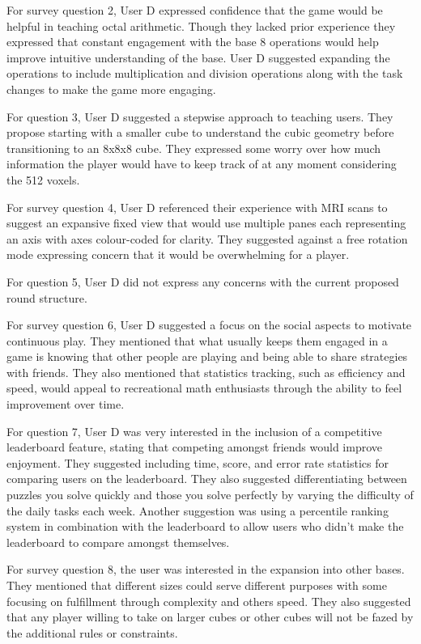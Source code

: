 \documentclass{article}
\begin{document}
For survey question 2, User D expressed confidence that the game would be helpful in teaching octal arithmetic.
Though they lacked prior experience they expressed that constant engagement with the base 8 operations would help improve intuitive understanding of the base.
User D suggested expanding the operations to include multiplication and division operations along with the task changes to make the game more engaging.

For question 3, User D suggested a stepwise approach to teaching users. They propose starting with a smaller cube to understand the cubic geometry before transitioning to an 8x8x8 cube.
They expressed some worry over how much information the player would have to keep track of at any moment considering the 512 voxels.

For survey question 4, User D referenced their experience with MRI scans to suggest an expansive fixed view that would use multiple panes each representing an axis with axes colour-coded for
clarity. They suggested against a free rotation mode expressing concern that it would be overwhelming for a player.

For question 5, User D did not express any concerns with the current proposed round structure.

For survey question 6, User D suggested a focus on the social aspects to motivate continuous play.
They mentioned that what usually keeps them engaged in a game is knowing that other people are playing and being able to
share strategies with friends. They also mentioned that statistics tracking, such as efficiency and speed, would appeal to
recreational math enthusiasts through the ability to feel improvement over time.

For question 7, User D was very interested in the inclusion of a competitive leaderboard feature, stating that competing amongst friends would improve enjoyment.
They suggested including time, score, and error rate statistics for comparing users on the leaderboard. They also suggested differentiating between puzzles you solve quickly and
those you solve perfectly by varying the difficulty of the daily tasks each week. Another suggestion was using a percentile ranking system in combination with the leaderboard to allow users who
didn't make the leaderboard to compare amongst themselves.

For survey question 8, the user was interested in the expansion into other bases.
They mentioned that different sizes could serve different purposes with some focusing on fulfillment through complexity and others speed. They also
suggested that any player willing to take on larger cubes or other cubes will not be fazed by the additional rules or constraints.
\end{document}
